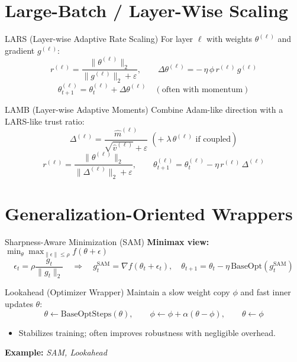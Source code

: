 \documentclass{beamer}
\begin{document}
\section{Large-Batch / Layer-Wise Scaling}

\begin{frame}{LARS (Layer-wise Adaptive Rate Scaling)}
For layer $\ell$ with weights $\theta^{(\ell)}$ and gradient $g^{(\ell)}$:
\[
  r^{(\ell)} = \frac{\|\theta^{(\ell)}\|_2}{\|g^{(\ell)}\|_2 + \varepsilon},\qquad
  \Delta \theta^{(\ell)} = -\,\eta\,\phi\, r^{(\ell)}\, g^{(\ell)}
\]
\[
  \theta^{(\ell)}_{t+1} = \theta^{(\ell)}_t + \Delta \theta^{(\ell)} \quad (\text{often with momentum})
\]
\end{frame}

\begin{frame}{LAMB (Layer-wise Adaptive Moments)}
Combine Adam-like direction with a LARS-like trust ratio:
\[
  \Delta^{(\ell)} = \frac{\hat m^{(\ell)}}{\sqrt{\hat v^{(\ell)}}+\varepsilon}\;(+\;\lambda\,\theta^{(\ell)}\text{ if coupled})
\]
\[
  r^{(\ell)}=\frac{\|\theta^{(\ell)}\|_2}{\|\Delta^{(\ell)}\|_2+\varepsilon},\qquad
  \theta^{(\ell)}_{t+1}=\theta^{(\ell)}_t - \eta\, r^{(\ell)}\, \Delta^{(\ell)}
\]
\end{frame}


\section{Generalization-Oriented Wrappers}

\begin{frame}{Sharpness-Aware Minimization (SAM)}
\textbf{Minimax view:} $\displaystyle \min_\theta \max_{\|\epsilon\|\le \rho} f(\theta+\epsilon)$
\[
  \epsilon_t = \rho \frac{g_t}{\|g_t\|_2} \quad \Rightarrow \quad
  g_t^{\text{SAM}} = \nabla f(\theta_t+\epsilon_t), \quad
  \theta_{t+1} = \theta_t - \eta\,\text{BaseOpt}(g_t^{\text{SAM}})
\]
\end{frame}

\begin{frame}{Lookahead (Optimizer Wrapper)}
Maintain a slow weight copy $\phi$ and fast inner updates $\theta$:
\[
  \theta \leftarrow \text{BaseOptSteps}(\theta),\qquad
  \phi \leftarrow \phi + \alpha(\theta - \phi),\qquad
  \theta \leftarrow \phi
\]
\begin{itemize}
  \item Stabilizes training; often improves robustness with negligible overhead.
\end{itemize}
\textbf{Example:} \emph{SAM, Lookahead}
\end{frame}
\end{document}
